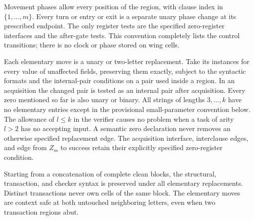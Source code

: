 Movement phases allow every position of the region, with clause
index in $\{1,\ldots,m\}$.  Every turn or entry or exit is a separate
unary phase change at its prescribed endpoint.  The only register
tests are the specified zero-register interfaces and the after-gate
tests.  This convention completely lists the control transitions;
there is no clock or phase stored on wing cells.

Each elementary move is a unary or two-letter replacement.  Take its
instances for every value of unaffected fields, preserving them
exactly, subject to the syntactic formats and the internal-pair
conditions on a pair used inside a region.  In an acquisition the
changed pair is tested as an internal pair after acquisition.  Every
zero mentioned so far is also unary or binary.  All strings of
lengths $3,\ldots,k$ have no elementary entries except in the
provisional small-parameter convention below.  The allowance of
$l\leq k$ in the verifier causes no problem when a task of arity
$l>2$ has no accepting input.  A semantic zero declaration never
removes an otherwise specified replacement edge.  The acquisition
interface, interclause edges, and edge from $Z_m$ to success retain
their explicitly specified zero-register condition.

\begin{lemma}\label{fr:context}
Starting from a concatenation of complete clean blocks, the
structural, transaction, and checker syntax is preserved under all
elementary replacements.  Distinct transactions never own cells of
the same block.  The elementary moves are context safe at both
untouched neighboring letters, even when two transaction regions
abut.
\end{lemma}

